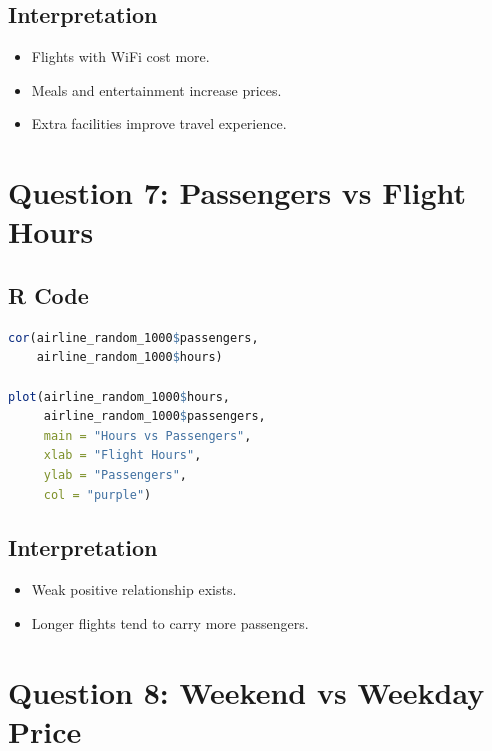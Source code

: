 \documentclass[12pt,a4paper]{article}
\begin{document}
\subsection{Interpretation}

\begin{itemize}
\item Flights with WiFi cost more.
\item Meals and entertainment increase prices.
\item Extra facilities improve travel experience.
\end{itemize}


\section{Question 7: Passengers vs Flight Hours}

\subsection{R Code}

\begin{lstlisting}[language=R]
cor(airline_random_1000$passengers,
    airline_random_1000$hours)

plot(airline_random_1000$hours,
     airline_random_1000$passengers,
     main = "Hours vs Passengers",
     xlab = "Flight Hours",
     ylab = "Passengers",
     col = "purple")
\end{lstlisting}

\subsection{Interpretation}

\begin{itemize}
\item Weak positive relationship exists.
\item Longer flights tend to carry more passengers.
\end{itemize}


\section{Question 8: Weekend vs Weekday Price}
\end{document}
